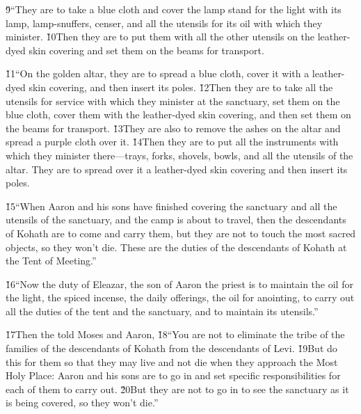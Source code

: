 \v{9}``They are to take a blue cloth and cover the lamp stand for the light with its lamp, lamp-snuffers, censer, and all the utensils for its oil with which they minister. \v{10}Then they are to put them with all the other utensils on the leather-dyed skin covering and set them on the beams for transport.

\v{11}``On the golden altar, they are to spread a blue cloth, cover it with a leather-dyed skin covering, and then insert its poles. \v{12}Then they are to take all the utensils for service with which they minister at the sanctuary, set them on the blue cloth, cover them with the leather-dyed skin covering, and then set them on the beams for transport. \v{13}They are also to remove the ashes on the altar and spread a purple cloth over it. \v{14}Then they are to put all the instruments with which they minister there---trays, forks, shovels, bowls, and all the utensils of the altar. They are to spread over it a leather-dyed skin covering and then insert its poles.

\v{15}``When Aaron and his sons have finished covering the sanctuary and all the utensils of the sanctuary, and the camp is about to travel, then the descendants of Kohath are to come and carry them, but they are not to touch the most sacred objects, so they won't die. These are the duties of the descendants of Kohath at the Tent of Meeting.''

\v{16}``Now the duty of Eleazar, the son of Aaron the priest is to maintain the oil for the light, the spiced incense, the daily offerings, the oil for anointing, to carry out all the duties of the tent and the sanctuary, and to maintain its utensils.''

\v{17}Then the  told Moses and Aaron, \v{18}``You are not to eliminate the tribe of the families of the descendants of Kohath from the descendants of Levi. \v{19}But do this for them so that they may live and not die when they approach the Most Holy Place: Aaron and his sons are to go in and set specific responsibilities for each of them to carry out. \v{20}But they are not to go in to see the sanctuary as it is being covered, so they won't die.''

